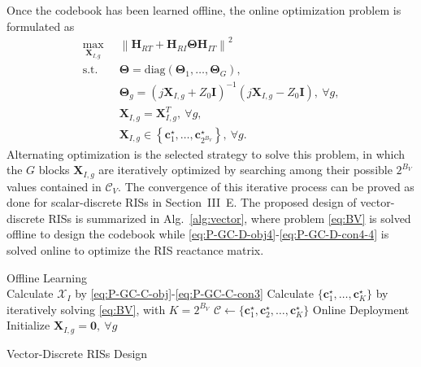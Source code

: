 \documentclass[twocolumn,10pt]{IEEEtran}
\let\oldnl\nl%
\newcommand{\nonl}{\renewcommand{\nl}{\let\nl\oldnl}}%
\begin{document}
Once the codebook has been learned offline, the online optimization problem is formulated as
\begin{align}
\underset{\mathbf{X}_{I,g}}{\mathsf{\mathrm{max}}}\;\;
& \left\|\mathbf{H}_{RT}+\mathbf{H}_{RI}\boldsymbol{\Theta}\mathbf{H}_{IT}\right\|^{2}\label{eq:P-GC-D-obj4}\\
\mathsf{\mathrm{s.t.}}\;\;\;
& \boldsymbol{\Theta}=\mathrm{diag}\left(\boldsymbol{\Theta}_{1},\ldots,\boldsymbol{\Theta}_{G}\right),\label{eq:P-GC-D-con4-1}\\
& \boldsymbol{\Theta}_{g}=\left(j\mathbf{X}_{I,g}+Z_{0}\mathbf{I}\right)^{-1}\left(j\mathbf{X}_{I,g}-Z_{0}\mathbf{I}\right),\:\forall g,\label{eq:P-GC-D-con4-2}\\
& \mathbf{X}_{I,g}=\mathbf{X}_{I,g}^{T},\:\forall g,\label{eq:P-GC-D-con4-3}\\
& \mathbf{X}_{I,g}\in\left\{\mathbf{c}_1^\star,\ldots,\mathbf{c}_{2^{B_V}}^\star\right\},\:\forall g.\label{eq:P-GC-D-con4-4}
\end{align}
Alternating optimization is the selected strategy to solve this problem, in which the $G$ blocks $\mathbf{X}_{I,g}$ are iteratively optimized by searching among their possible $2^{B_V}$ values contained in $\mathcal{C}_V$.
The convergence of this iterative process can be proved as done for scalar-discrete RISs in Section~III~E.
The proposed design of vector-discrete RISs is summarized in Alg.~\ref{alg:vector}, where problem \eqref{eq:BV} is solved offline to design the codebook while \eqref{eq:P-GC-D-obj4}-\eqref{eq:P-GC-D-con4-4} is solved online to optimize the RIS reactance matrix.

\begin{algorithm}[t]
\nonl Offline Learning\\
Calculate $\mathcal{X}_I$ by \eqref{eq:P-GC-C-obj}-\eqref{eq:P-GC-C-con3}\;
Calculate $\{\mathbf{c}_1^\star,\ldots,\mathbf{c}_K^\star\}$ by iteratively solving \eqref{eq:BV}, with $K=2^{B_V}$\;
$\mathcal{C}\leftarrow\{\mathbf{c}_{1}^\star,\mathbf{c}_{2}^\star,\ldots,\mathbf{c}_{K}^\star\}$\;
\nonl Online Deployment\\
Initialize $\mathbf{X}_{I,g}=\mathbf{0},\:\forall g$\;
\caption{Vector-Discrete RISs Design}
\label{alg:vector}
\end{algorithm}
\end{document}
